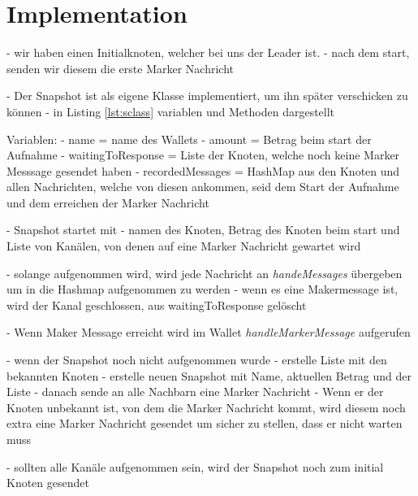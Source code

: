 \section{Implementation}
\label{sec:impl}

- wir haben einen Initialknoten, welcher bei uns der Leader ist.
- nach dem start, senden wir diesem die erste Marker Nachricht

- Der Snapshot ist als eigene Klasse implementiert, um ihn später 
  verschicken zu können
- in Listing \ref{lst:sclass} variablen und Methoden dargestellt

Variablen:
 - name = name des Wallets
 - amount = Betrag beim start der Aufnahme
 - waitingToResponse = Liste der Knoten, welche noch keine Marker Messsage
  gesendet haben
 - recordedMessages = HashMap aus den Knoten und allen Nachrichten, welche
  von diesen ankommen, seid dem Start der Aufnahme und dem erreichen der
   Marker Nachricht
   
- Snapshot startet mit
  - namen des Knoten, Betrag des Knoten beim start und Liste von Kanälen, 
  von denen auf eine Marker Nachricht gewartet wird
  
- solange aufgenommen wird, wird jede Nachricht an \textit{handeMessages} 
  übergeben um in die Hashmap aufgenommen zu werden
  - wenn es eine Makermessage ist, wird der Kanal geschlossen, aus
   waitingToResponse gelöscht
   
- Wenn Maker Message erreicht wird im Wallet \textit{handleMarkerMessage}
 aufgerufen
 
- wenn der Snapshot noch nicht aufgenommen wurde
  - erstelle Liste mit den bekannten Knoten
  - erstelle neuen Snapshot mit Name, aktuellen Betrag und der Liste
  - danach sende an alle Nachbarn eine Marker Nachricht
- Wenn er der Knoten unbekannt ist, von dem die Marker Nachricht kommt, 
  wird diesem noch extra eine Marker Nachricht gesendet um sicher zu 
  stellen, dass er nicht warten muss
  
- sollten alle Kanäle aufgenommen sein, wird der Snapshot noch zum initial 
  Knoten gesendet